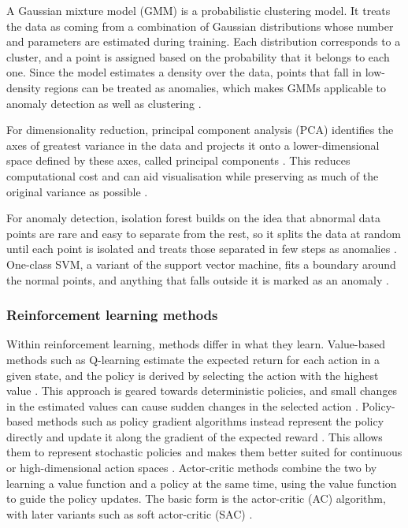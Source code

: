 A Gaussian mixture model (GMM) is a probabilistic clustering model. 
It treats the data as coming from a combination of Gaussian 
distributions whose number and parameters are estimated during 
training. Each distribution corresponds to a cluster, and a point is 
assigned based on the probability that it belongs to each one. Since 
the model estimates a density over the data, points that fall in 
low-density regions can be treated as anomalies, which makes GMMs 
applicable to anomaly detection as well as clustering 
\parencite[Chapter~9]{geron2019hands_on_machine_learning}.

For dimensionality reduction, principal component analysis (PCA) 
identifies the axes of greatest variance in the data and projects 
it onto a lower-dimensional space defined by these axes, called 
principal components 
\parencite{hotelling1932pca,
geron2019hands_on_machine_learning}. 
This reduces computational cost and can aid visualisation while 
preserving as much of the original variance as possible 
\parencites[Chapter~8]{geron2019hands_on_machine_learning}{sarker2021machine_learning_algorithms_real_world_applications_research_directions}.

For anomaly detection, isolation forest builds 
on the idea that abnormal data points are rare 
and easy to separate from the rest, so it splits the data at random 
until each point is isolated and treats those separated in few steps 
as anomalies 
\parencite{liu2008isolation_forest}. 
One-class SVM, a variant of the support vector machine, fits a 
boundary around the normal points, and anything that falls outside 
it is marked as an anomaly 
\parencite[Chapter~9]{geron2019hands_on_machine_learning}.

\subsubsection*{Reinforcement learning methods}

Within reinforcement learning, methods differ in what they learn. 
Value-based methods such as Q-learning estimate the expected return 
for each action in a given state, and the policy is derived by 
selecting the action with the highest value 
\parencites{watkins1992q_learning}{zhang2020taxonomy_reinforcement_learning_algorithms}. 
This approach is geared towards deterministic policies, and small 
changes in the estimated values can cause sudden changes in the 
selected action 
\parencite{sutton1999policy_gradient_methods_reinforcement_learning}. 
Policy-based methods such as policy gradient algorithms instead 
represent the policy directly and update it along the gradient of 
the expected reward 
\parencite{sutton1999policy_gradient_methods_reinforcement_learning}. 
This allows them to represent stochastic policies and makes them 
better suited for continuous or high-dimensional action spaces 
\parencite{zhang2020taxonomy_reinforcement_learning_algorithms}. 
Actor-critic methods combine the two by learning a value function 
and a policy at the same time, using the value function to guide the 
policy updates. The basic form is the actor-critic (AC) algorithm, 
with later variants such as soft actor-critic (SAC) 
\parencite{zhang2020taxonomy_reinforcement_learning_algorithms}.


